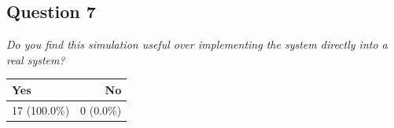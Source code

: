\subsection{Question 7}
\emph{Do you find this simulation useful over implementing the system directly into a real system?}
\begin{table}[H]
	\begin{center}
		\small \begin{tabular*}{0.35\columnwidth}{lr}
			\\ \hline \hline
			Yes & No \\ \hline \hline

		 	17 (100.0\%) & 0 (0.0\%)\\ \hline
		\end{tabular*}
	\end{center}
\end{table}


